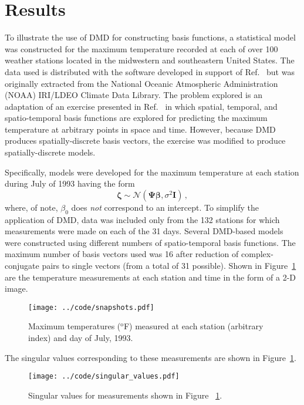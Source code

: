 \documentclass[review,number,sort&compress,12pt]{elsarticle}
\begin{document}
\section{Results}
\label{sec:results}

To illustrate the use of DMD for constructing basis functions, a statistical model was constructed for the maximum temperature recorded at each of over 100 weather stations located in the midwestern and southeastern United States. 
The data used is distributed with the software developed in support of Ref.~\cite{wikle2019sts} but was originally extracted from the National Oceanic Atmospheric Administration (NOAA) IRI/LDEO Climate Data Library.
The problem explored  is an adaptation of an exercise presented in Ref.~\cite{wikle2019sts} in which spatial, temporal, and spatio-temporal basis functions are explored for predicting the maximum temperature at arbitrary points in space and time.
However, because DMD produces spatially-discrete basis vectors, the exercise was modified to produce spatially-discrete models.

Specifically, models were developed for the maximum temperature at each station during July of 1993 having the form
\begin{equation}
 \boldsymbol{\zeta} \sim \mathcal{N}(\boldsymbol{\Psi}\boldsymbol{\beta}, \sigma^2 \mathbf{I}) \, ,
\end{equation}
where, of note, $\beta_0$ does {\it not} correspond to an intercept.
To simplify the application of DMD, data was included only from the 132 stations for which measurements were made on each of the 31 days.
Several DMD-based models were constructed using different numbers of spatio-temporal basis functions.  
The maximum number of basis vectors used was 16 after reduction of complex-conjugate pairs to single vectors (from a total of 31 possible).  
Shown in Figure~\ref{fig:snapshots} are the temperature measurements at each station and time in the form of a 2-D image.
\begin{figure}[h]
 \centering
 \texttt{[image: ../code/snapshots.pdf]}\\
   \caption{Maximum temperatures ($^\text{o}$F) measured at each station (arbitrary index) and day of July, 1993.}
  \label{fig:snapshots}
\end{figure}
The singular values corresponding to these measurements are shown in Figure~\ref{fig:snapshots}.
\begin{figure}[h]
 \centering
 \texttt{[image: ../code/singular\_values.pdf]}\\
   \caption{Singular values for measurements shown in Figure ~\ref{fig:snapshots}.}
  \label{fig:singular_values}
\end{figure}
\end{document}

